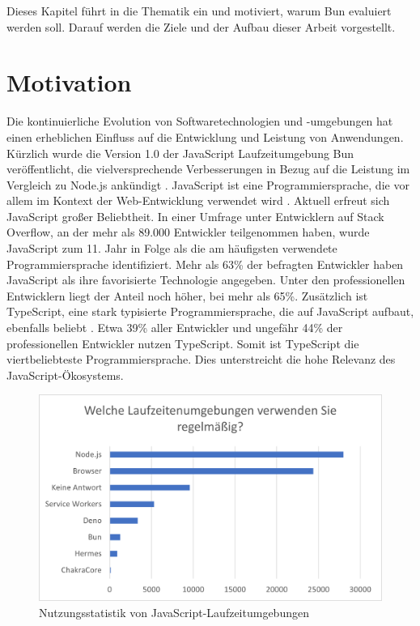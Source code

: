 \pagestyle{fancy-style}
 \label{introduction}
Dieses Kapitel führt in die Thematik ein und motiviert, warum Bun evaluiert werden soll. Darauf werden die Ziele und der Aufbau dieser Arbeit vorgestellt.

\section{Motivation} \label{sec:introduction-motivation}
Die kontinuierliche Evolution von Softwaretechnologien und -umgebungen hat einen erheblichen Einfluss auf die Entwicklung und Leistung von Anwendungen. Kürzlich wurde die Version 1.0 der JavaScript Laufzeitumgebung Bun veröffentlicht, die vielversprechende Verbesserungen in Bezug auf die Leistung im Vergleich zu Node.js ankündigt \cite{Sumner.2023}. \newline
JavaScript ist eine Programmiersprache, die vor allem im Kontext der Web-Entwicklung verwendet wird \cite{Brown.November2019}. Aktuell erfreut sich JavaScript großer Beliebtheit. In einer Umfrage unter Entwicklern auf Stack Overflow, an der mehr als 89.000 Entwickler teilgenommen haben, wurde JavaScript zum 11. Jahr in Folge als die am häufigsten verwendete Programmiersprache identifiziert. Mehr als 63\% der befragten Entwickler haben JavaScript als ihre favorisierte Technologie angegeben. Unter den professionellen Entwicklern liegt der Anteil noch höher, bei mehr als 65\%. Zusätzlich ist TypeScript, eine stark typisierte Programmiersprache, die auf 
JavaScript aufbaut, ebenfalls beliebt \cite{Microsoft.o.J.}. Etwa 39\% aller Entwickler und ungefähr 44\% der professionellen Entwickler nutzen TypeScript. Somit ist TypeScript die viertbeliebteste Programmiersprache. \cite{StackOverflow.2023} Dies unterstreicht die hohe Relevanz des JavaScript-Ökosystems.\\

\begin{figure}[h]
	\centering
	\includegraphics[width=\linewidth]{./images/WhichRuntimesDoYouUseRegularly}
	\caption{Nutzungsstatistik von JavaScript-Laufzeitumgebungen \cite{Greif.2022}}
	\label{fig:runtime-share}
\end{figure}

